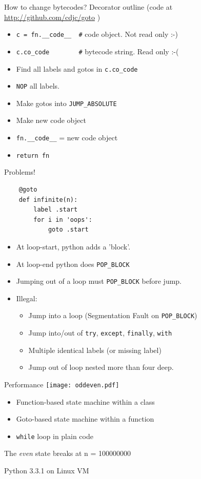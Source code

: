 \documentclass{beamer}
\begin{document}
\begin{frame}[fragile]{How to change bytecodes?}
Decorator outline (code at \href{http://github.com/cdjc/goto} {http://github.com/cdjc/goto} )
\begin{itemize}
\item \verb!c = fn.__code__  #! code object. Not read only :-)
\item \verb!c.co_code        #! bytecode string. Read only :-(
\item Find all labels and gotos in \verb!c.co_code!
\item \verb!NOP! all labels.
\item Make gotos into \verb!JUMP_ABSOLUTE!
\item Make new code object
\item \verb!fn.__code__! = new code object
\item \verb!return fn!
\end{itemize}
\end{frame}

\begin{frame}[fragile]{Problems!}
\begin{verbatim}
    @goto
    def infinite(n):
        label .start
        for i in 'oops':
            goto .start
\end{verbatim}

\begin{itemize}
\item At loop-start, python adds a 'block'.
\item At loop-end python does \verb!POP_BLOCK!
\item Jumping out of a loop must \verb!POP_BLOCK! before jump.
\item Illegal:
\begin{itemize}
\item Jump into a loop (Segmentation Fault on \verb!POP_BLOCK!)
\item Jump into/out of \verb!try!, \verb!except!, \verb!finally!, \verb!with!
\item Multiple identical labels (or missing label)
\item Jump out of loop nested more than four deep.
\end{itemize}
\end{itemize}
\end{frame}

\begin{frame}[fragile]{Performance}
%
\texttt{[image: oddeven.pdf]}

\begin{itemize}
\item Function-based state machine within a class
\item Goto-based state machine within a function
\item \verb!while! loop in plain code
\end{itemize}

The \emph{even} state breaks at n = 100000000

Python 3.3.1 on Linux VM
\end{frame}
\end{document}
